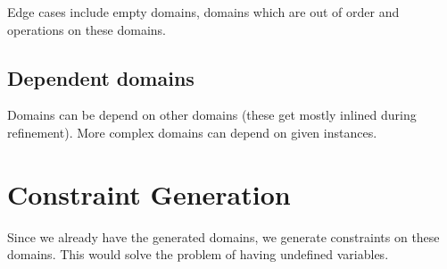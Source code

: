 Edge cases include empty domains,  domains which are out of order and operations on these domains.

\subsection{Dependent domains}

Domains can be depend on other domains  (these get mostly inlined during refinement). More complex domains can depend on given instances.

\section{Constraint Generation}

Since we already have the generated domains, we generate constraints on these domains. This would solve the problem of having undefined variables.






